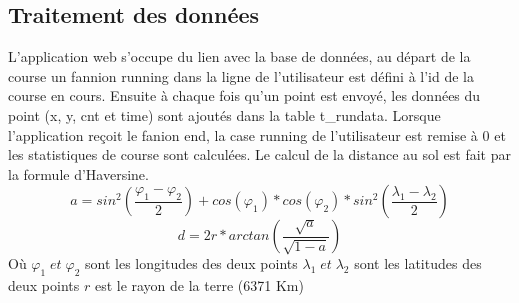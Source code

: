 \documentclass[a4paper,11pt]{article}
\begin{document}
\subsection{Traitement des données}
L'application web s'occupe du lien avec la base de données, au départ de la course un fannion running dans la ligne de l'utilisateur est défini à l'id de la course en cours.\newline
Ensuite à chaque fois qu'un point est envoyé, les données du point (x, y, cnt et time) sont ajoutés dans la table t\_rundata.\newline
Lorsque l'application reçoit le fanion end, la case running de l'utilisateur est remise à 0 et les statistiques de course sont calculées.
Le calcul de la distance au sol est fait par la formule d'Haversine.
\begin{equation*}
a = sin^2(\frac{\varphi_1 - \varphi_2}{2}) + cos(\varphi_1) * cos(\varphi_2) * sin^2(\frac{\lambda_1 - \lambda_2}{2})
\end{equation*}
\begin{equation*}
d = 2r *arctan\left(\frac{\sqrt{a}}{\sqrt{1-a}}\right)
\end{equation*}
Où \newline
$\varphi_1 \; et \; \varphi_2$ sont les longitudes des deux points\newline
$\lambda_1 \; et \; \lambda_2$ sont les latitudes des deux points\newline
$r$ est le rayon de la terre (6371 Km)\newline
\end{document}
